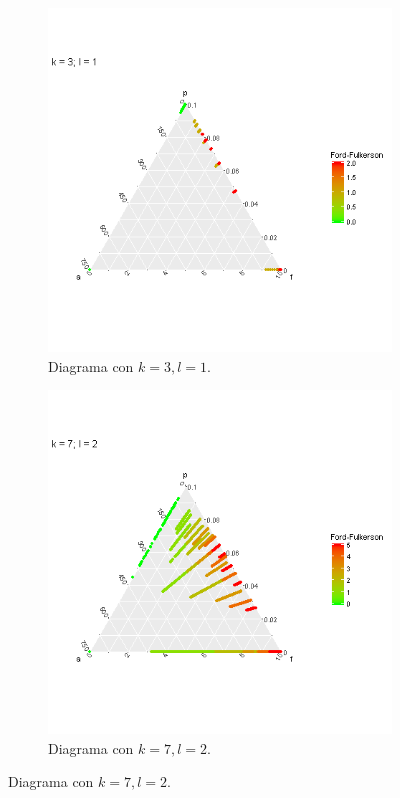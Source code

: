 \documentclass{article}
\begin{document}
  \begin{figure}[h] %
    \centering
    \begin{subfigure}[b]{0.45\textwidth}
      \includegraphics[width=\textwidth]{k009l001}
      \caption{Diagrama con $k = 3, l = 1$.}
      \label{fig:a}
    \end{subfigure}
    \begin{subfigure}[b]{0.45\textwidth}
      \includegraphics[width=\textwidth]{k049l002}
      \caption{Diagrama con $k = 7, l = 2$.}
      \label{fig:b}
    \end{subfigure}



\end{figure}
\end{document}
